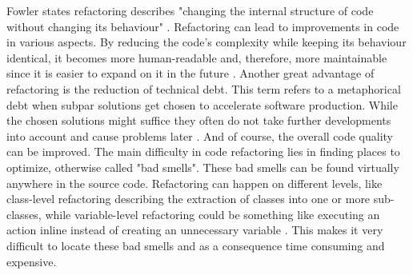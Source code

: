 Fowler states refactoring describes "changing the internal structure of code without changing its behaviour" \cite{fowler2018refactoring}.
Refactoring can lead to improvements in code in various aspects. By reducing the code's complexity while keeping its behaviour identical, it becomes more human-readable and, therefore, more maintainable since it is easier to expand on it in the future \cite{kaur2016analysis}.
Another great advantage of refactoring is the reduction of technical debt. This term refers to a metaphorical debt when subpar solutions get chosen to accelerate software production. While the chosen solutions might suffice they often do not take further developments into account and cause problems later \cite{techdebt}.
And of course, the overall code quality can be improved.
The main difficulty in code refactoring lies in finding places to optimize, otherwise called "bad smells". These bad smells can be found virtually anywhere in the source code. Refactoring can happen on different levels, like class-level refactoring describing the extraction of classes into one or more sub-classes, while variable-level refactoring could be something like executing an action inline instead of creating an unnecessary variable \cite{aniche2020effectiveness}. This makes it very difficult to locate these bad smells and as a consequence time consuming and expensive.